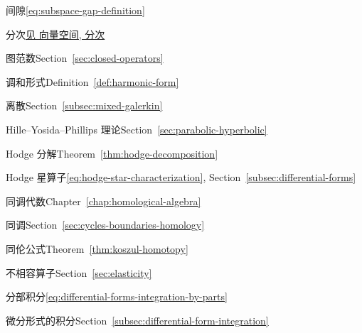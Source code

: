 \begin{theindex}
\item {}\label{index:gap}{间隙}\quad \eqref{eq:subspace-gap-definition}

\item {}\label{index:grading}{分次}\quad \hyperref[index:vector-space-graded]{{见 向量空间, 分次}}

\item {}\label{index:graph-norm}{图范数}\quad Section~\ref{sec:closed-operators}

\item {}\label{index:harmonic-form}{调和形式}\quad Definition~\ref{def:harmonic-form}

\subitem {}\label{index:harmonic-form-discrete}{离散}\quad Section~\ref{subsec:mixed-galerkin}

\item {}\label{index:hille-yosida-phillips-theory}{Hille–Yosida–Phillips 理论}\quad Section~\ref{sec:parabolic-hyperbolic}

\item {}\label{index:hodge-decomposition}{Hodge 分解}\quad Theorem~\ref{thm:hodge-decomposition}

\item {}\label{index:hodge-star}{Hodge 星算子}\quad \eqref{eq:hodge-star-characterization}, Section~\ref{subsec:differential-forms}

\item {}\label{index:homological-algebra}{同调代数}\quad Chapter~\ref{chap:homological-algebra}

\item {}\label{index:homology}{同调}\quad Section~\ref{sec:cycles-boundaries-homology}

\item {}\label{index:homotopy-formula}{同伦公式}\quad Theorem~\ref{thm:koszul-homotopy}

\item {}\label{index:incompatibility-operator}{不相容算子}\quad Section~\ref{sec:elasticity}

\item {}\label{index:integration-by-parts}{分部积分}\quad \eqref{eq:differential-forms-integration-by-parts}

\item {}\label{index:integration-of-differential-forms}{微分形式的积分}\quad Section~\ref{subsec:differential-form-integration}


\end{theindex}
